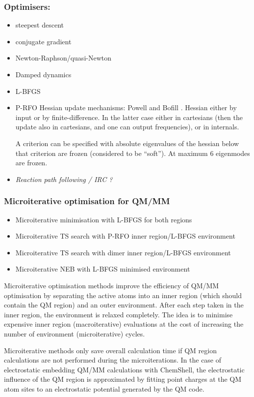 \documentclass{article}
\begin{document}
\subsubsection{Optimisers:}
\begin{itemize}
\item steepest descent
\item conjugate gradient
\item Newton-Raphson/quasi-Newton
\item Damped dynamics
\item L-BFGS
\item P-RFO Hessian update mechanisms: Powell \cite{pow71} and Bofill
  \cite{bof94}. Hessian either by input or by finite-difference. In the latter
  case either in cartesians (then the update also in cartesians, and one can
  output frequencies), or in internals.

  A criterion can be specified with absolute eigenvalues of the hessian below
  that criterion are frozen (considered to be ``soft''). At maximum 6
  eigenmodes are frozen.
\item \emph{Reaction path following / IRC ?}
\end{itemize}

\subsubsection{Microiterative optimisation for QM/MM}
\begin{itemize}
\item Microiterative minimisation with L-BFGS for both regions
\item Microiterative TS search with P-RFO inner region/L-BFGS environment
\item Microiterative TS search with dimer inner region/L-BFGS environment
\item Microiterative NEB with L-BFGS minimised environment
\end{itemize}

Microiterative optimisation methods improve the efficiency of QM/MM optimisation 
by separating the active atoms into an inner region (which should contain the QM region) 
and an outer environment. After each step taken in the inner region, the environment 
is relaxed completely. The idea is to minimise expensive inner region (macroiterative) 
evaluations at the cost of increasing the number of environment (microiterative) cycles.

Microiterative methods only save overall calculation time if QM region calculations 
are not performed during the microiterations. In the case of electrostatic embedding 
QM/MM calculations with ChemShell, the electrostatic influence of the QM region is 
approximated by fitting point charges at the QM atom sites to an electrostatic 
potential generated by the QM code. 
\end{document}
